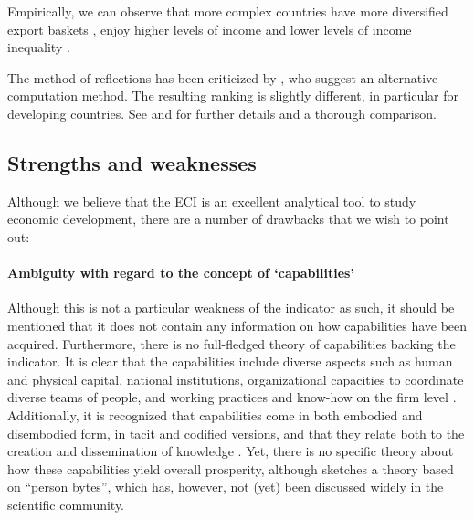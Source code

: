 \documentclass[abstract=on]{scrartcl}
\begin{document}
Empirically, we can observe that more complex countries have more diversified export baskets \citep[they do not necessarily stop exporting simple products, see][]{Tacchella:2013ko}, enjoy higher levels of income \citep{Hidalgo:2009be} and lower levels of income inequality \citep{Hartmann:2017ic}.


The method of reflections has been criticized by \citet{Tacchella:2013ko}, who suggest an alternative computation method. 
The resulting ranking is slightly different, in particular for developing countries.
See \citet{Tacchella:2012fx} and \citet{Tacchella:2013ko}  for further details and a thorough comparison.

\subsection{Strengths and weaknesses}
Although we believe that the ECI is an excellent analytical tool to study economic development, there are a number of drawbacks that we wish to point out:

\paragraph{Ambiguity with regard to the concept of `capabilities'}
Although this is not a particular weakness of the indicator as such, it should be mentioned that it does not contain any information on how capabilities have been acquired.
Furthermore, there is no full-fledged theory of capabilities backing the indicator.
It is clear that the capabilities include diverse aspects such as human and physical capital, national institutions, organizational capacities to coordinate diverse teams of people, and working practices and know-how on the firm level  \citep[e.g.][p. 37]{Felipe:2012fv}.
Additionally, it is recognized that capabilities come in both embodied and disembodied form, in tacit and codified versions, and that they relate both to the creation and dissemination of knowledge \citep[e.g.][p. 177-178]{Archibugi:2005iu}.
Yet, there is no specific theory about how these capabilities yield overall prosperity, although \citet{Hidalgo:2015vs} sketches a theory based on ``person bytes'', which has, however, not (yet) been discussed widely in the scientific community.
\end{document}
